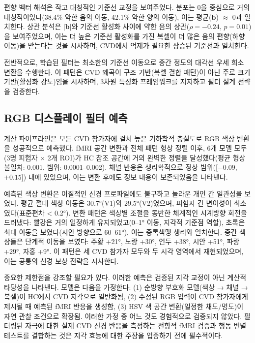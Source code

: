 \documentclass[12pt,a4paper]{article}
\begin{document}
편향 벡터 해석은 작고 대칭적인 기준선 교정을 보여주었다. 분포는 0을 중심으로 거의 대칭적이었다(38.4\% 약한 음의 이동, 42.1\% 약한 양의 이동), 이는 평균($\mathbf{b}$) $\approx$ 0과 일치한다. 상관 분석은 $|\mathbf{b}|$와 기준선 활성화 사이에 약한 음의 상관($\rho = -0.24$, $p = 0.01$)을 보여주었으며, 이는 더 높은 기준선 활성화를 가진 복셀이 더 많은 음의 편향(하향 이동)을 받는다는 것을 시사하며, CVD에서 억제가 필요한 상승된 기준선과 일치한다.

전반적으로, 학습된 필터는 최소한의 기준선 이동으로 중간 정도의 대각선 우세 희소 변환을 수행한다. 이 패턴은 CVD 왜곡이 구조 기반(복셀 결합 패턴)이 아닌 주로 크기 기반(활성화 강도)임을 시사하며, 3차원 특성화 프레임워크를 지지하고 필터 설계 전략을 검증한다.

\subsection{RGB 디스플레이 필터 예측}

계산 파이프라인은 모든 CVD 참가자에 걸쳐 높은 기하학적 충실도로 RGB 색상 변환을 성공적으로 예측했다. fMRI 공간 변환과 전체 패턴 형상 정렬 이후, 6개 모델 모두(3명 피험자 × 2개 ROI)가 HC 참조 공간에 거의 완벽한 정렬을 달성했다(평균 형상 불일치: 0.001, 범위: 0.0001--0.002). 채널 반응은 생리학적으로 정상 범위([$-0.09$, $+0.15$]) 내에 있었으며, 이는 변환 후에도 정보 내용이 보존되었음을 나타낸다.

예측된 색상 변환은 이질적인 신경 프로파일에도 불구하고 놀라운 개인 간 일관성을 보였다. 평균 절대 색상 이동은 30.7°(V1)와 29.5°(V2)였으며, 피험자 간 변이성이 최소였다(표준편차 < 0.2°). 변환 패턴은 색상별 조절을 동반한 체계적인 시계방향 회전을 드러냈다: 빨강은 거의 일정하게 유지되었고(0--1° 이동, 지각적 기준점 역할), 초록은 최대 이동을 보였다(시안 방향으로 60--61°), 이는 중록색맹 생리와 일치한다. 중간 색상들은 단계적 이동을 보였다: 주황 +21°, 노랑 +30°, 연두 +38°, 시안 +51°, 파랑 +29°, 자홍 +9°. 이 패턴은 세 CVD 참가자 모두와 두 시각 영역에서 재현되었으며, 이는 공통의 신경 보상 전략을 시사한다.

중요한 제한점을 강조할 필요가 있다. 이러한 예측은 검증된 지각 교정이 아닌 계산적 타당성을 나타낸다. 모델은 다음을 가정한다: (1) 순방향 부호화 모델(색상 → 채널 → 복셀)이 HC에서 CVD 지각으로 일반화됨, (2) 수정된 RGB 입력이 CVD 참가자에게 제시될 때 예측된 fMRI 반응을 생성함, (3) HSV 색 공간 변환(일정한 채도/명도)이 자연 관찰 조건으로 확장됨. 이러한 가정 중 어느 것도 경험적으로 검증되지 않았다. 필터링된 자극에 대한 실제 CVD 신경 반응을 측정하는 전향적 fMRI 검증과 행동 변별 테스트를 결합하는 것은 지각 효능에 대한 주장을 입증하기 전에 필수적이다.
\end{document}
